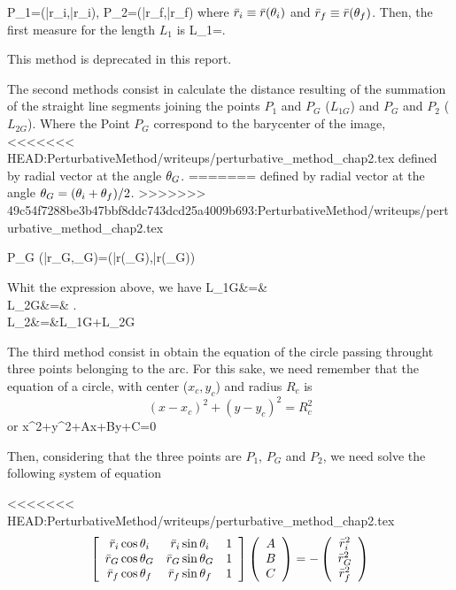 \beq
P_1=(\bar{r}_i,\bar{r}_{i}), \quad
P_2=(\bar{r}_f,\bar{r}_{f})
\eeq
where $\bar{r}_i\equiv \bar{r}(\theta_i)$ and $\bar{r}_f\equiv \bar{r}(\theta_f)$.
Then, the first measure for the length $L_1$ is
\beq
L_1=.
\eeq

This method is deprecated in this report.

The second methods consist in calculate the distance resulting of the summation
of the straight line segments joining the points $P_1$ and $P_G$ ($L_{1G}$) and $P_G$
and $P_2$ ($L_{2G}$). Where the Point $P_G$ correspond to the barycenter of the image,
<<<<<<< HEAD:PerturbativeMethod/writeups/perturbative_method_chap2.tex
defined by radial vector at the angle $\theta_G$.
=======
defined by radial vector at the angle $\theta_G=(\theta_i+\theta_f)/2$.
>>>>>>> 49c54f7288be3b47bbf8ddc743dcd25a4009b693:PerturbativeMethod/writeups/perturbative_method_chap2.tex

\beq
P_G\equiv
(\bar{r}_G,\te_G)=(\bar{r}(\te_G),\bar{r}(\te_G))
\eeq

Whit the expression above, we have
\bea
L_{1G}&=&\\ 
L_{2G}&=&
.\\
L_2&=&L_{1G}+L_{2G}
\eea

The third method consist in obtain the equation of the circle passing throught
three points belonging to the arc. For this sake, we need remember that the
equation of a circle, with center ($x_{c},y_{c}$) and radius $R_c$ is
\begin{equation*}
 (x-x_c)^2+(y-y_c)^2=R^2_c
\end{equation*}
or
\beq
x^2+y^2+Ax+By+C=0\\
\eeq 

Then, considering that the three points are $P_1$, $P_G$ and $P_2$, we need
solve the following system of equation

<<<<<<< HEAD:PerturbativeMethod/writeups/perturbative_method_chap2.tex
\begin{equation}
 \left[\begin{array}{c c c}
        \bar{r}_i\cos{\theta_i} & \bar{r}_i\sin{\theta_i} & 1\\
	\bar{r}_G\cos{\theta_G} & \bar{r}_G\sin{\theta_G} & 1\\
	\bar{r}_f\cos{\theta_f} & \bar{r}_f\sin{\theta_f} & 1\\
\end{array} \right]\left(\begin{array}{c} A \\ B\\ C
\end{array}\right)=-\left(\begin{array}{c}                         
\bar{r}^2_i\\ \bar{r}^2_G\\ \bar{r}^2_f\end{array}  \right) 
\end{equation}

